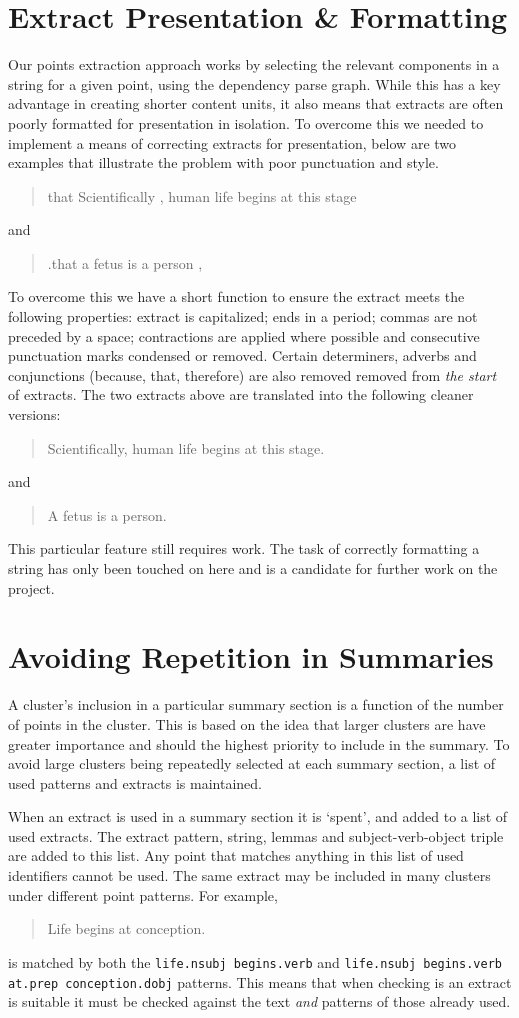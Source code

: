   \section{Extract Presentation \& Formatting}
    Our points extraction approach works by selecting the relevant components in a string for a given point, using the dependency parse graph. While this has a key advantage in creating shorter content units, it also means that extracts are often poorly formatted for presentation in isolation. To overcome this we needed to implement a means of correcting extracts for presentation, below are two examples that illustrate the problem with poor punctuation and style.

    \blockquote{that Scientifically , human life begins at this stage}
    and
    \blockquote{.that a fetus is a person ,}

    To overcome this we have a short function to ensure the extract meets the following properties: extract is capitalized; ends in a period; commas are not preceded by a space; contractions are applied where possible and consecutive punctuation marks condensed or removed. Certain determiners, adverbs and conjunctions (because, that, therefore) are also removed removed from \textit{the start} of extracts. The two extracts above are translated into the following cleaner versions:

    \blockquote{Scientifically, human life begins at this stage.}
    and
    \blockquote{A fetus is a person.}

    This particular feature still requires work. The task of correctly formatting a string has only been touched on here and is a candidate for further work on the project.

  \section{Avoiding Repetition in Summaries}
    A cluster's inclusion in a particular summary section is a function of the number of points in the cluster. This is based on the idea that larger clusters are have greater importance and should the highest priority to include in the summary. To avoid large clusters being repeatedly selected at each summary section, a list of used patterns and extracts is maintained.

    When an extract is used in a summary section it is `spent', and added to a list of used extracts. The extract pattern, string, lemmas and subject-verb-object triple are added to this list. Any point that matches anything in this list of used identifiers cannot be used. The same extract may be included in many clusters under different point patterns. For example, \blockquote{Life begins at conception.} is matched by both the \texttt{life.nsubj begins.verb} and \texttt{life.nsubj begins.verb at.prep conception.dobj} patterns. This means that when checking is an extract is suitable it must be checked against the text \textit{and} patterns of those already used.

